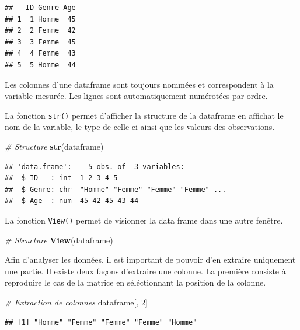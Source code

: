 \documentclass[
]{book}
\newenvironment{Shaded}{\begin{snugshade}}{\end{snugshade}}
\newcommand{\CommentTok}[1]{\textcolor[rgb]{0.56,0.35,0.01}{\textit{#1}}}
\newcommand{\DecValTok}[1]{\textcolor[rgb]{0.00,0.00,0.81}{#1}}
\newcommand{\FunctionTok}[1]{\textcolor[rgb]{0.13,0.29,0.53}{\textbf{#1}}}
\newcommand{\NormalTok}[1]{#1}
\begin{document}
\begin{verbatim}
##   ID Genre Age
## 1  1 Homme  45
## 2  2 Femme  42
## 3  3 Femme  45
## 4  4 Femme  43
## 5  5 Homme  44
\end{verbatim}

Les colonnes d'une dataframe sont toujours nommées et correspondent à la variable mesurée. Les lignes sont automatiquement numérotées par ordre.

La fonction \texttt{str()} permet d'afficher la structure de la dataframe en affichat le nom de la variable, le type de celle-ci ainsi que les valeurs des observations.

\begin{Shaded}
\begin{Highlighting}[]
\CommentTok{\# Structure}
\FunctionTok{str}\NormalTok{(dataframe)}
\end{Highlighting}
\end{Shaded}

\begin{verbatim}
## 'data.frame':    5 obs. of  3 variables:
##  $ ID   : int  1 2 3 4 5
##  $ Genre: chr  "Homme" "Femme" "Femme" "Femme" ...
##  $ Age  : num  45 42 45 43 44
\end{verbatim}

La fonction \texttt{View()} permet de visionner la data frame dans une autre fenêtre.

\begin{Shaded}
\begin{Highlighting}[]
\CommentTok{\# Structure}
\FunctionTok{View}\NormalTok{(dataframe)}
\end{Highlighting}
\end{Shaded}

Afin d'analyser les données, il est important de pouvoir d'en extraire uniquement une partie. Il existe deux façons d'extraire une colonne. La première consiste à reproduire le cas de la matrice en séléctionnant la position de la colonne.

\begin{Shaded}
\begin{Highlighting}[]
\CommentTok{\# Extraction de colonnes}
\NormalTok{dataframe[, }\DecValTok{2}\NormalTok{]}
\end{Highlighting}
\end{Shaded}

\begin{verbatim}
## [1] "Homme" "Femme" "Femme" "Femme" "Homme"
\end{verbatim}
\end{document}
